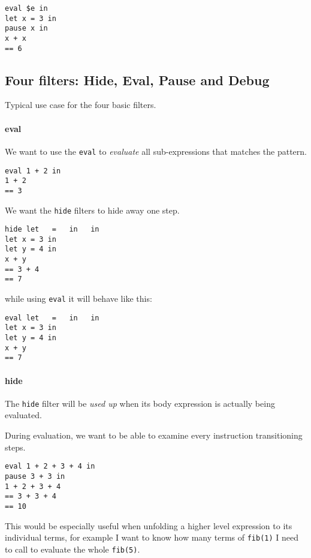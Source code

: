 \begin{verbatim}
eval $e in
let x = 3 in
pause x in
x + x
== 6
\end{verbatim}


\subsection{Four filters: Hide, Eval, Pause and Debug}


Typical use case for the four basic filters.

\paragraph{eval} We want to use the \verb|eval| to \emph{evaluate} all sub-expressions that matches the pattern.
\begin{verbatim}
eval 1 + 2 in
1 + 2
== 3
\end{verbatim}

We want the \verb|hide| filters to hide away one step.
\begin{verbatim}
hide let   =   in   in
let x = 3 in
let y = 4 in
x + y
== 3 + 4
== 7
\end{verbatim}
while using \verb|eval| it will behave like this:
\begin{verbatim}
eval let   =   in   in
let x = 3 in
let y = 4 in
x + y
== 7
\end{verbatim}

\paragraph{hide} The \verb|hide| filter will be \emph{used up} when its body
expression is actually being evaluated.

During evaluation, we want to be able to examine every instruction
transitioning steps.

\begin{verbatim}
eval 1 + 2 + 3 + 4 in
pause 3 + 3 in
1 + 2 + 3 + 4
== 3 + 3 + 4
== 10
\end{verbatim}

This would be especially useful when unfolding a higher level
expression to its individual terms, for example I want to know how
many terms of \verb|fib(1)| I need to call to evaluate the whole
\verb|fib(5)|.

